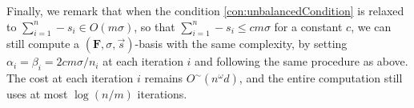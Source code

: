  Finally, we remark that when the condition
\eqref{con:unbalancedCondition} is relaxed to $\sum_{i=1}^{n}-s_{i}\in O\left(m\sigma\right)$,
so that $\sum_{i=1}^{n}-s_{i}\le cm\sigma$ for a constant $c$, we
can still compute a $\left(\mathbf{F},\sigma,\vec{s}\right)$-basis
with the same complexity, by setting $\alpha_{i}=\beta_{i}=2cm\sigma/n_{i}$
at each iteration $i$ and following the same procedure as above.
The cost at each iteration $i$ remains $O^{\sim}\left(n^{\omega}d\right)$,
and the entire computation still uses at most $\log(n/m)$ iterations. 
